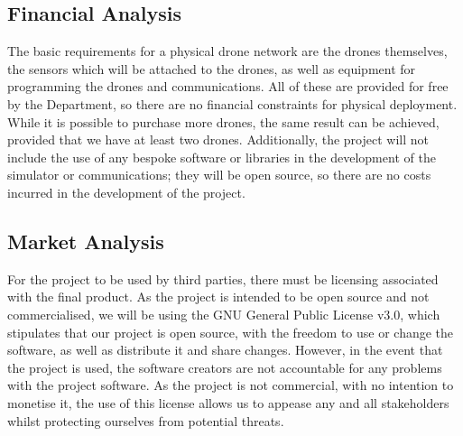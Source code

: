		\subsection{Financial Analysis}
		The basic requirements for a physical drone network are the drones themselves, the sensors which will be attached to the drones, as well as equipment for programming the drones and communications. All of these are provided for free by the Department, so there are no financial constraints for physical deployment. While it is possible to purchase more drones, the same result can be achieved, provided that we have at least two drones. Additionally, the project will not include the use of any bespoke software or libraries in the development of the simulator or communications; they will be open source, so there are no costs incurred in the development of the project.
		\subsection{Market Analysis}
		For the project to be used by third parties, there must be licensing associated with the final product. As the project is intended to be open source and not commercialised, we will be using the GNU General Public License v3.0, which stipulates that our project is open source, with the freedom to use or change the software, as well as distribute it and share changes. However, in the event that the project is used, the software creators are not accountable for any problems with the project software. As the project is not commercial, with no intention to monetise it, the use of this license allows us to appease any and all stakeholders whilst protecting ourselves from potential threats.
